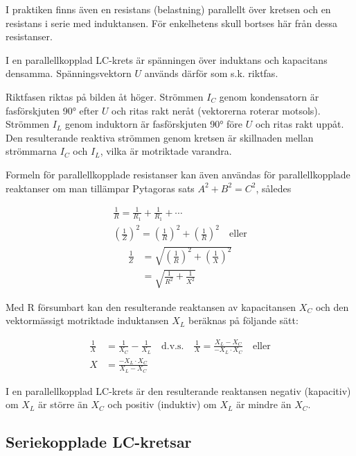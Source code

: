 I praktiken finns även en resistans (belastning) parallellt över kretsen och en
resistans i serie med induktansen. För enkelhetens skull bortses här från dessa
resistanser.

I en parallellkopplad LC-krets är spänningen över induktans och kapacitans
densamma. Spänningsvektorn \(U\) används därför som s.k. riktfas.

Riktfasen riktas på bilden åt höger. Strömmen \(I_C\) genom kondensatorn är
fasförskjuten 90° efter \(U\) och ritas rakt neråt (vektorerna roterar motsols).
Strömmen \(I_L\) genom induktorn är fasförskjuten 90° före \(U\) och ritas rakt
uppåt. Den resulterande reaktiva strömmen genom kretsen är skillnaden mellan
strömmarna \(I_C\) och \(I_L\), vilka är motriktade varandra.

Formeln för parallellkopplade resistanser kan även användas för
parallellkopplade reaktanser om man tillämpar Pytagoras sats
\(A^2 + B^2 = C^2\), således

\begin{gather*}
  \frac{1}{R} = \frac{1}{R_1} + \frac{1}{R_1} + \cdots \\
  \left(\frac{1}{Z}\right)^2 = \left(\frac{1}{R}\right)^2 +
  \left(\frac{1}{R}\right)^2 \quad \text{eller}
\end{gather*}
\begin{align*}
  \frac{1}{Z} &=
  \sqrt{\left(\frac{1}{R}\right)^2 + \left(\frac{1}{X}\right)^2} \\
  &= \sqrt{\frac{1}{R^2} + \frac{1}{X^2}}
\end{align*}

Med R försumbart kan den resulterande reaktansen av kapacitansen \(X_C\) och den
vektormässigt motriktade induktansen \(X_L\) beräknas på följande sätt:

\begin{align*}
  \frac{1}{X} &= \frac{1}{X_C} - \frac{1}{X_L} \quad \text{d.v.s.} \quad
  \frac{1}{X} = \frac{X_L - X_C}{-X_L \cdot X_C} \quad \text{eller} \\
  X &= \frac{-X_L \cdot X_C}{X_L - X_C}
\end{align*}

I en parallellkopplad LC-krets är den resulterande reaktansen negativ
(kapacitiv) om \(X_L\) är större än \(X_C\) och positiv (induktiv) om \(X_L\) är
mindre än \(X_C\).

\subsection{Seriekopplade LC-kretsar}

